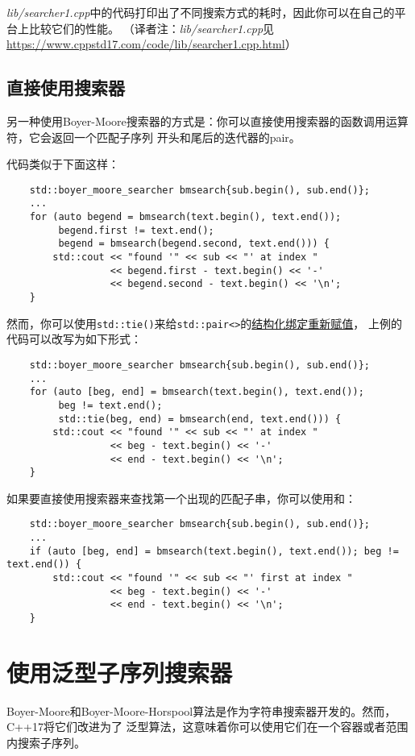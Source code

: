 \emph{lib/searcher1.cpp}中的代码打印出了不同搜索方式的耗时，因此你可以在自己的平台上比较它们的性能。
（译者注：\emph{lib/searcher1.cpp}见\url{https://www.cppstd17.com/code/lib/searcher1.cpp.html}）

\subsection{直接使用搜索器}\label{ch24.1.2}
另一种使用Boyer-Moore搜索器的方式是：你可以直接使用搜索器的函数调用运算符，它会返回一个匹配子序列
开头和尾后的迭代器的pair。

代码类似于下面这样：
\begin{lstlisting}
    std::boyer_moore_searcher bmsearch{sub.begin(), sub.end()};
    ...
    for (auto begend = bmsearch(text.begin(), text.end());
         begend.first != text.end();
         begend = bmsearch(begend.second, text.end())) {
        std::cout << "found '" << sub << "' at index "
                  << begend.first - text.begin() << '-'
                  << begend.second - text.begin() << '\n';
    }
\end{lstlisting}
然而，你可以使用\texttt{std::tie()}来给\texttt{std::pair<>}的\hyperref[ch1.2.3.4]{结构化绑定重新赋值}，
上例的代码可以改写为如下形式：
\begin{lstlisting}
    std::boyer_moore_searcher bmsearch{sub.begin(), sub.end()};
    ...
    for (auto [beg, end] = bmsearch(text.begin(), text.end());
         beg != text.end();
         std::tie(beg, end) = bmsearch(end, text.end())) {
        std::cout << "found '" << sub << "' at index "
                  << beg - text.begin() << '-'
                  << end - text.begin() << '\n';
    }
\end{lstlisting}
如果要直接使用搜索器来查找第一个出现的匹配子串，你可以使用和：
\begin{lstlisting}
    std::boyer_moore_searcher bmsearch{sub.begin(), sub.end()};
    ...
    if (auto [beg, end] = bmsearch(text.begin(), text.end()); beg != text.end()) {
        std::cout << "found '" << sub << "' first at index "
                  << beg - text.begin() << '-'
                  << end - text.begin() << '\n';
    }
\end{lstlisting}


\section{使用泛型子序列搜索器}
Boyer-Moore和Boyer-Moore-Horspool算法是作为字符串搜索器开发的。然而，C++17将它们改进为了
泛型算法，这意味着你可以使用它们在一个容器或者范围内搜索子序列。

